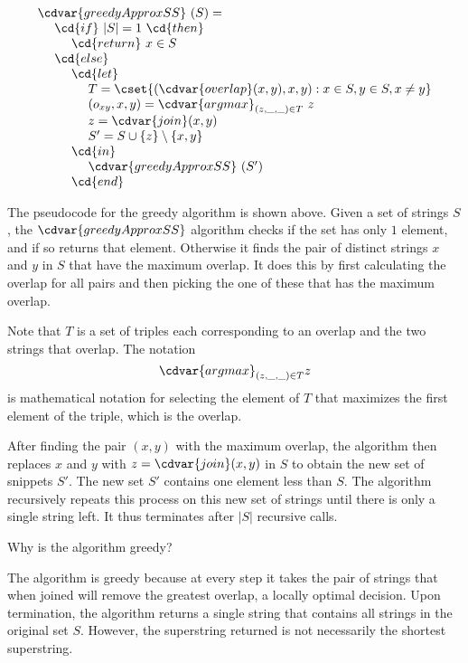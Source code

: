\begin{algorithm}
\label{alg:genome::alg::greedySS}
\[
\begin{array}{l}
\cdvar{greedyApproxSS}~(S) = 
\\
~~~~\cd{if}~|S| = 1~\cd{then}
\\ 
~~~~~~~~\cd{return}~x \in S
\\
~~~~\cd{else}
\\
~~~~~~~~\cd{let}
\\
~~~~~~~~~~~~T = \cset{(\cdvar{overlap}(x, y), x, y) : x \in S, y \in S, x \neq
  y}
\\
~~~~~~~~~~~~(o_{xy}, x, y) = \cdvar{argmax}_{(z, \_, \_) \in T} ~z
\\
~~~~~~~~~~~~z = \cdvar{join} (x, y)
\\
~~~~~~~~~~~~S' = S \cup \{z\} \setminus \{x,y\}
\\
~~~~~~~~\cd{in}
\\
~~~~~~~~~~~~\cdvar{greedyApproxSS}~(S')
\\
~~~~~~~~\cd{end}
\end{array}
\] 


The pseudocode for the greedy algorithm is shown above.
%
Given a set of strings $S$, the $\cdvar{greedyApproxSS}$ algorithm
checks if the set has only $1$ element, and if so returns that element.
%
Otherwise it finds the pair of distinct strings $x$ and $y$ in $S$
that have the maximum overlap.  It does this by first calculating the
overlap for all pairs and then picking the one of these that has the
maximum overlap.
%

Note that $T$ is a set of triples each corresponding to an overlap and
the two strings that overlap.  The notation 
\[
\cdvar{argmax}_{(z, \_, \_) \in T} z
\]
is mathematical notation for selecting the element of $T$ that
maximizes the first element of the triple, which is the overlap.
%

After finding the pair $(x,y)$ with the maximum overlap, the
algorithm then replaces $x$ and $y$ with $z = \cdvar{join}(x,y)$
in $S$ to obtain the new set of snippets $S'$.
%
The new set $S'$ contains one element less than $S$.
%
The algorithm recursively repeats this process on this new set of
strings until there is only a single string left.  It thus terminates
after $|S|$ recursive calls.
\end{algorithm}



\begin{cflex}
\begin{exercise}
Why is the algorithm greedy?
\end{exercise}

\begin{solution}
The algorithm is greedy because at every step it takes the pair of
strings that when joined will remove the greatest overlap, a locally
optimal decision.  Upon termination, the algorithm returns a single
string that contains all strings in the original set $S$.  However,
the superstring returned is not necessarily the shortest superstring.
\end{solution}
\end{cflex}

